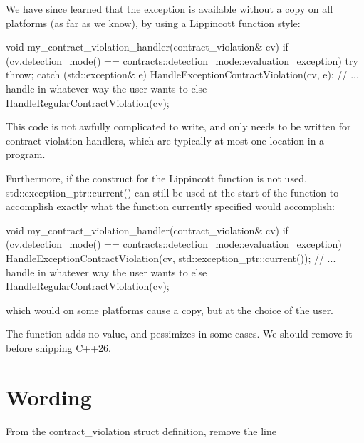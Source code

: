 We have since learned that the exception is available without a copy on all platforms (as far as we know), by using a Lippincott function style:

\begin{codeblock}
void my_contract_violation_handler(contract_violation& cv) {
  if (cv.detection_mode() == contracts::detection_mode::evaluation_exception) {
    try {
      throw;
    } catch (std::exception& e) {
      HandleExceptionContractViolation(cv, e); // ... handle in whatever way the user wants to
    }
  } else {
    HandleRegularContractViolation(cv);
  }
}
\end{codeblock}

This code is not awfully complicated to write, and only needs to be written for contract violation handlers, which are typically at most one location in a program.

Furthermore, if the construct for the Lippincott function is not used, std::exception_ptr::current() can still be used at the start of the function to accomplish exactly what the function currently specified would accomplish:

\begin{codeblock}
void my_contract_violation_handler(contract_violation& cv) {
  if (cv.detection_mode() == contracts::detection_mode::evaluation_exception) {
    HandleExceptionContractViolation(cv, std::exception_ptr::current()); // ... handle in whatever way the user wants to
  } else {
    HandleRegularContractViolation(cv);
  }
}
\end{codeblock}

which would on some platforms cause a copy, but at the choice of the user.

The  function adds no value, and pessimizes in some cases. We should remove it before shipping C++26.

\section{Wording}

From the contract_violation struct definition, remove the line








